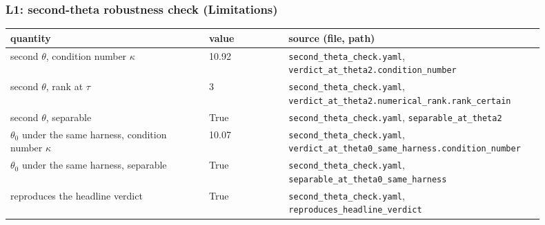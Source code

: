 \subsubsection*{L1: second-theta robustness check (Limitations)}
\begin{longtable}{p{0.35\linewidth} p{0.14\linewidth} p{0.41\linewidth}}
\toprule
quantity & value & source (file, path) \\
\midrule
\endhead
second $\theta$, condition number $\kappa$ & 10.92 & \texttt{\footnotesize second\_\allowbreak{}theta\_\allowbreak{}check.\allowbreak{}yaml}, \texttt{\footnotesize verdict\_\allowbreak{}at\_\allowbreak{}theta2.\allowbreak{}condition\_\allowbreak{}number} \\
second $\theta$, rank at $\tau$ & 3 & \texttt{\footnotesize second\_\allowbreak{}theta\_\allowbreak{}check.\allowbreak{}yaml}, \texttt{\footnotesize verdict\_\allowbreak{}at\_\allowbreak{}theta2.\allowbreak{}numerical\_\allowbreak{}rank.\allowbreak{}rank\_\allowbreak{}certain} \\
second $\theta$, separable & True & \texttt{\footnotesize second\_\allowbreak{}theta\_\allowbreak{}check.\allowbreak{}yaml}, \texttt{\footnotesize separable\_\allowbreak{}at\_\allowbreak{}theta2} \\
$\theta_0$ under the same harness, condition number $\kappa$ & 10.07 & \texttt{\footnotesize second\_\allowbreak{}theta\_\allowbreak{}check.\allowbreak{}yaml}, \texttt{\footnotesize verdict\_\allowbreak{}at\_\allowbreak{}theta0\_\allowbreak{}same\_\allowbreak{}harness.\allowbreak{}condition\_\allowbreak{}number} \\
$\theta_0$ under the same harness, separable & True & \texttt{\footnotesize second\_\allowbreak{}theta\_\allowbreak{}check.\allowbreak{}yaml}, \texttt{\footnotesize separable\_\allowbreak{}at\_\allowbreak{}theta0\_\allowbreak{}same\_\allowbreak{}harness} \\
reproduces the headline verdict & True & \texttt{\footnotesize second\_\allowbreak{}theta\_\allowbreak{}check.\allowbreak{}yaml}, \texttt{\footnotesize reproduces\_\allowbreak{}headline\_\allowbreak{}verdict} \\
\bottomrule
\end{longtable}

